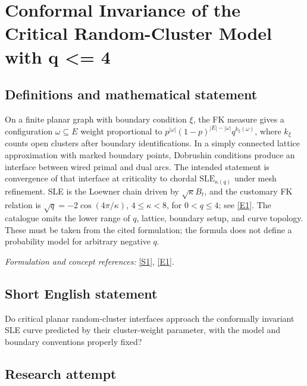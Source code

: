 \documentclass[11pt,a4paper]{article}
\newcommand{\sref}[2]{\hyperlink{source:#1:#2}{[S#2]}}
\newcommand{\eref}[2]{\hyperlink{extra:#1:#2}{[E#2]}}
\newif\ifshowcatalogue
\newcommand{\cataloguescope}[1]{\ifshowcatalogue
 \paragraph{Exact scope in the supplied catalogue.}
 \begin{quote}\small #1\end{quote}\fi}
\numberwithin{equation}{section}
\begin{document}
\setcounter{section}{0}
\clearpage
\section*{\texorpdfstring{Conformal Invariance of the Critical Random-Cluster Model with q <= 4}{Conformal Invariance of the Critical Random-Cluster Model with q <= 4}}\label{30006768}
\subsection{Definitions and mathematical statement}
On a finite planar graph with boundary condition $\xi$, the FK measure gives a configuration $\omega\subseteq E$ weight proportional to
$p^{|\omega|}(1-p)^{|E|-|\omega|}q^{k_\xi(\omega)}$, where $k_\xi$ counts open clusters after boundary identifications. In a simply connected lattice approximation with marked boundary points, Dobrushin conditions produce an interface between wired primal and dual arcs. The intended statement is convergence of that interface at criticality to chordal $\mathrm{SLE}_{\kappa(q)}$ under mesh refinement. SLE is the Loewner chain driven by $\sqrt\kappa B_t$, and the customary FK relation is $\sqrt q=-2\cos(4\pi/\kappa)$, $4\le\kappa<8$, for $0<q\le4$; see \eref{30006768}{1}. The catalogue omits the lower range of $q$, lattice, boundary setup, and curve topology. These must be taken from the cited formulation; the formula does not define a probability model for arbitrary negative $q$.
\par\smallskip\textit{Formulation and concept references:} \sref{30006768}{1}, \eref{30006768}{1}.
\cataloguescope{Prove that the exploration path of the critical random-cluster (FK) model with q <= 4 converges in distribution to a Schramm-Loewner evolution SLE\_\{kappa(q)\} as the mesh size goes to zero, i.e., the scaling limit is conformally invariant.}
\subsection{Short English statement}
Do critical planar random-cluster interfaces approach the conformally invariant SLE curve predicted by their cluster-weight parameter, with the model and boundary conventions properly fixed?
\subsection{Research attempt}
\end{document}
